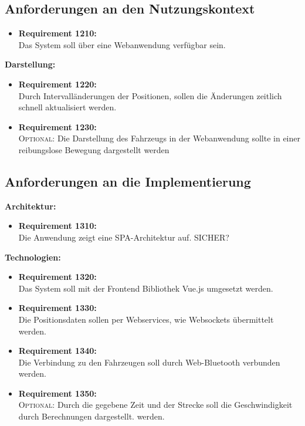 \subsection{Anforderungen an den Nutzungskontext}
\begin{itemize}
\item \textbf{Requirement 1210:}\\
Das System soll \"uber eine Webanwendung verf\"ugbar sein.
\end{itemize}
\textbf{Darstellung:}
\begin{itemize}
\item \textbf{Requirement 1220:}\\
Durch Intervall\"anderungen der Positionen, sollen die \"Anderungen zeitlich schnell aktualisiert werden.
\item \textbf{Requirement 1230:}\\
\textsc{Optional:} Die Darstellung des Fahrzeugs in der Webanwendung sollte in einer reibungslose Bewegung dargestellt werden
\end{itemize}
\subsection{Anforderungen an die Implementierung}
\textbf{Architektur:}
\begin{itemize}
\item \textbf{Requirement 1310:}\\
Die Anwendung zeigt eine \ac{SPA}-Architektur auf. SICHER?
\end{itemize}
\textbf{Technologien:}
\begin{itemize}
\item \textbf{Requirement 1320:}\\
Das System soll mit der Frontend Bibliothek Vue.js umgesetzt werden.
\item \textbf{Requirement 1330:}\\
Die Positionsdaten sollen per Webservices, wie Websockets \"ubermittelt werden.
\item \textbf{Requirement 1340:}\\
Die Verbindung zu den Fahrzeugen soll durch Web-Bluetooth verbunden werden.
\item \textbf{Requirement 1350:}\\
\textsc{Optional:} Durch die gegebene Zeit und der Strecke soll die Geschwindigkeit durch Berechnungen dargestellt.
 werden.
\end{itemize}